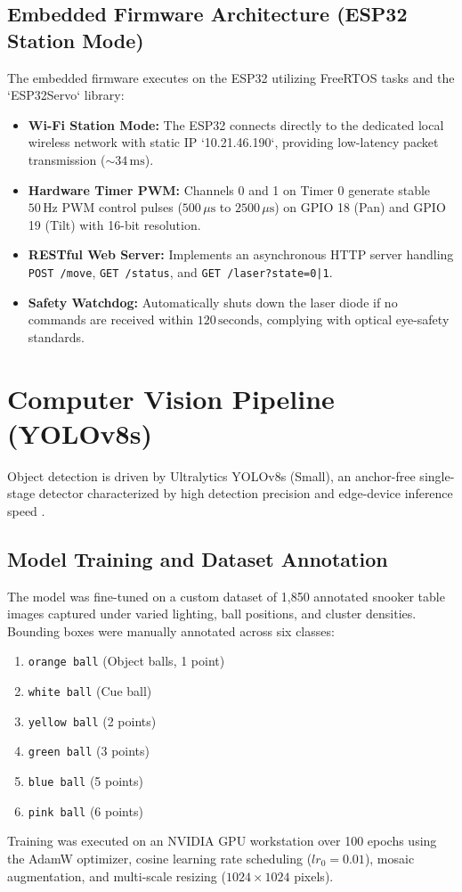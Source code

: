 \subsection{Embedded Firmware Architecture (ESP32 Station Mode)}
The embedded firmware executes on the ESP32 utilizing FreeRTOS tasks and the `ESP32Servo` library:
\begin{itemize}
    \item \textbf{Wi-Fi Station Mode:} The ESP32 connects directly to the dedicated local wireless network with static IP `10.21.46.190`, providing low-latency packet transmission ($\sim 34\,\text{ms}$).
    \item \textbf{Hardware Timer PWM:} Channels 0 and 1 on Timer 0 generate stable $50\,\text{Hz}$ PWM control pulses ($500\,\mu\text{s}$ to $2500\,\mu\text{s}$) on GPIO 18 (Pan) and GPIO 19 (Tilt) with 16-bit resolution.
    \item \textbf{RESTful Web Server:} Implements an asynchronous HTTP server handling \texttt{POST /move}, \texttt{GET /status}, and \texttt{GET /laser?state=0|1}.
    \item \textbf{Safety Watchdog:} Automatically shuts down the laser diode if no commands are received within $120\,\text{seconds}$, complying with optical eye-safety standards.
\end{itemize}

\section{Computer Vision Pipeline (YOLOv8s)}
Object detection is driven by Ultralytics YOLOv8s (Small), an anchor-free single-stage detector characterized by high detection precision and edge-device inference speed \cite{ref11, ref12}.

\subsection{Model Training and Dataset Annotation}
The model was fine-tuned on a custom dataset of 1,850 annotated snooker table images captured under varied lighting, ball positions, and cluster densities. Bounding boxes were manually annotated across six classes:
\begin{enumerate}
    \item \texttt{orange ball} (Object balls, 1 point)
    \item \texttt{white ball} (Cue ball)
    \item \texttt{yellow ball} (2 points)
    \item \texttt{green ball} (3 points)
    \item \texttt{blue ball} (5 points)
    \item \texttt{pink ball} (6 points)
\end{enumerate}
Training was executed on an NVIDIA GPU workstation over 100 epochs using the AdamW optimizer, cosine learning rate scheduling ($lr_0 = 0.01$), mosaic augmentation, and multi-scale resizing ($1024 \times 1024$ pixels).

